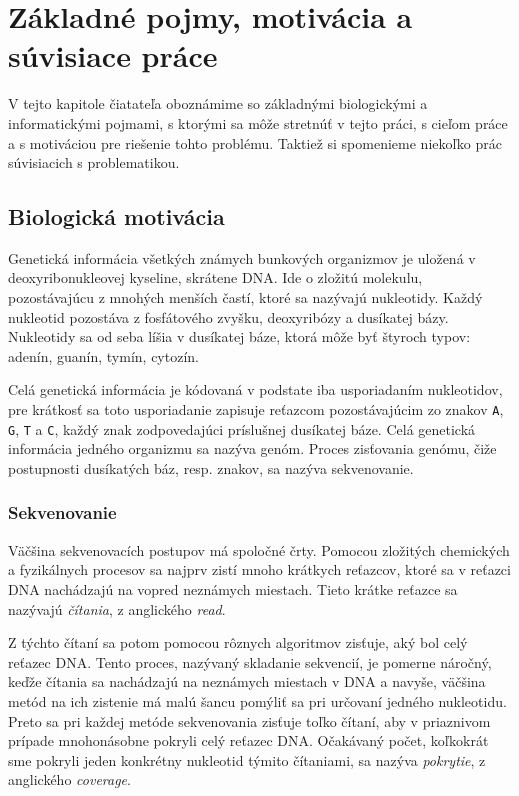 \chapter{Základné pojmy, motivácia a súvisiace práce}

V tejto kapitole čiatateľa oboznámime so základnými biologickými
a informatickými pojmami, s ktorými sa môže stretnúť v tejto práci, s cieľom práce
a s motiváciou pre riešenie tohto problému. Taktiež si spomenieme niekoľko
prác súvisiacich s problematikou.

\section{Biologická motivácia}

Genetická informácia všetkých známych bunkových organizmov je uložená v
deoxyribonukleovej kyseline, skrátene DNA. Ide o zložitú molekulu, pozostávajúcu
z mnohých menších častí, ktoré sa nazývajú nukleotidy. Každý nukleotid pozostáva
z fosfátového zvyšku, deoxyribózy a dusíkatej bázy. Nukleotidy sa od seba líšia
v dusíkatej báze, ktorá môže byť štyroch typov: adenín, guanín, tymín, cytozín.

Celá genetická informácia je kódovaná v podstate iba usporiadaním nukleotidov,
pre krátkosť sa toto usporiadanie zapisuje reťazcom pozostávajúcim
zo znakov \verb_A_, \verb_G_, \verb_T_ a \verb_C_, každý znak zodpovedajúci
príslušnej dusíkatej báze. Celá genetická informácia jedného organizmu sa nazýva
genóm. Proces zisťovania genómu, čiže postupnosti dusíkatých báz, resp.
znakov, sa nazýva sekvenovanie.

\subsection{Sekvenovanie}

Väčšina sekvenovacích postupov má spoločné črty. Pomocou zložitých chemických
a fyzikálnych procesov sa najprv zistí mnoho krátkych reťazcov, ktoré sa
v reťazci DNA nachádzajú na vopred neznámych miestach. Tieto krátke reťazce
sa nazývajú \emph{čítania}, z anglického \emph{read}.

Z týchto čítaní sa potom pomocou rôznych algoritmov zisťuje, aký bol celý reťazec DNA.
Tento proces, nazývaný skladanie sekvencií, je pomerne náročný, keďže čítania sa nachádzajú na neznámych miestach
v DNA a navyše, väčšina metód na ich zistenie má malú šancu pomýliť sa pri určovaní
jedného nukleotidu. Preto sa pri každej metóde sekvenovania zisťuje toľko čítaní, aby
v priaznivom prípade mnohonásobne pokryli celý reťazec DNA. Očakávaný počet, koľkokrát
sme pokryli jeden konkrétny nukleotid týmito čítaniami, sa nazýva \emph{pokrytie},
z anglického \emph{coverage}.

